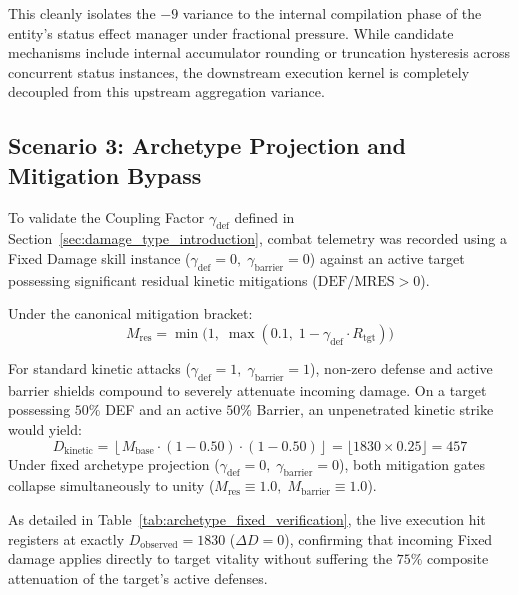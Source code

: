 \documentclass[twocolumn,10pt]{article}
\begin{document}
This cleanly isolates the $-9$ variance to the internal compilation phase of the entity's status effect manager under fractional pressure. While candidate mechanisms include internal accumulator rounding or truncation hysteresis across concurrent status instances, the downstream execution kernel is completely decoupled from this upstream aggregation variance.

\subsection{Scenario 3: Archetype Projection and Mitigation Bypass}

To validate the Coupling Factor $\gamma_{\text{def}}$ defined in Section~\ref{sec:damage_type_introduction}, combat telemetry was recorded using a Fixed Damage skill instance ($\gamma_{\text{def}} = 0, \; \gamma_{\text{barrier}} = 0$) against an active target possessing significant residual kinetic mitigations ($\text{DEF} / \text{MRES} > 0$).

Under the canonical mitigation bracket:
\begin{equation}
 M_{\text{res}} = \min \Big( 1, \; \max \left( 0.1, \; 1 - \gamma_{\text{def}} \cdot R_{\text{tgt}} \right) \Big)
\end{equation}

For standard kinetic attacks ($\gamma_{\text{def}} = 1, \; \gamma_{\text{barrier}} = 1$), non-zero defense and active barrier shields compound to severely attenuate incoming damage. On a target possessing $50\%$ DEF and an active $50\%$ Barrier, an unpenetrated kinetic strike would yield:
\begin{equation}
D_{\text{kinetic}} = \left\lfloor M_{\text{base}} \cdot (1 - 0.50) \cdot (1 - 0.50) \right\rfloor = \lfloor 1830 \times 0.25 \rfloor = 457
\end{equation}
Under fixed archetype projection ($\gamma_{\text{def}} = 0, \; \gamma_{\text{barrier}} = 0$), both mitigation gates collapse simultaneously to unity ($M_{\text{res}} \equiv 1.0, \; M_{\text{barrier}} \equiv 1.0$). 

As detailed in Table~\ref{tab:archetype_fixed_verification}, the live execution hit registers at exactly $D_{\text{observed}} = 1830$ ($\Delta D = 0$), confirming that incoming Fixed damage applies directly to target vitality without suffering the $75\%$ composite attenuation of the target's active defenses.
\end{document}
